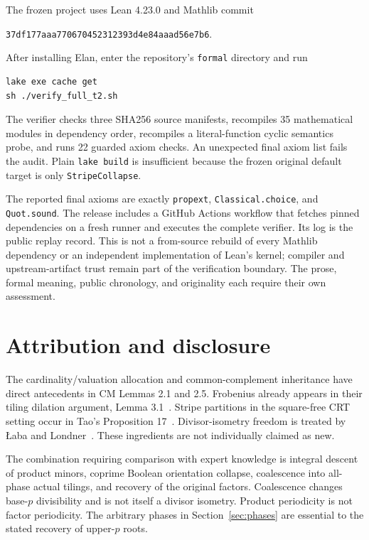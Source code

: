 \documentclass[11pt]{article}
\newcommand{\code}[1]{\texttt{\small #1}}
\begin{document}
The frozen project uses Lean 4.23.0 and Mathlib commit
\begin{center}\code{37df177aaa770670452312393d4e84aaad56e7b6}.\end{center}
After installing Elan, enter the repository's \code{formal} directory and run
\begin{verbatim}
lake exe cache get
sh ./verify_full_t2.sh
\end{verbatim}
The verifier checks three SHA256 source manifests, recompiles 35 mathematical modules in dependency order, recompiles a literal-function cyclic semantics probe, and runs 22 guarded axiom checks. An unexpected final axiom list fails the audit. Plain \code{lake build} is insufficient because the frozen original default target is only \code{StripeCollapse}.

The reported final axioms are exactly \code{propext}, \code{Classical.choice}, and \code{Quot.sound}. The release includes a GitHub Actions workflow that fetches pinned dependencies on a fresh runner and executes the complete verifier. Its log is the public replay record. This is not a from-source rebuild of every Mathlib dependency or an independent implementation of Lean's kernel; compiler and upstream-artifact trust remain part of the verification boundary. The prose, formal meaning, public chronology, and originality each require their own assessment.

\section{Attribution and disclosure}
The cardinality/valuation allocation and common-complement inheritance have direct antecedents in CM Lemmas 2.1 and 2.5. Frobenius already appears in their tiling dilation argument, Lemma 3.1~\cite{CM}. Stripe partitions in the square-free CRT setting occur in Tao's Proposition 17~\cite{Tao}. Divisor-isometry freedom is treated by \L aba and Londner~\cite[Definition 3.3 and Lemma 3.4]{LL}. These ingredients are not individually claimed as new.

The combination requiring comparison with expert knowledge is integral descent of product minors, coprime Boolean orientation collapse, coalescence into all-phase actual tilings, and recovery of the original factors. Coalescence changes base-$p$ divisibility and is not itself a divisor isometry. Product periodicity is not factor periodicity. The arbitrary phases in Section~\ref{sec:phases} are essential to the stated recovery of upper-$p$ roots.
\end{document}
